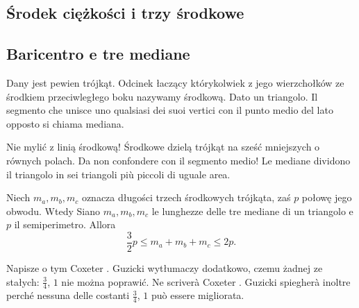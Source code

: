 
%

\subsection{Środek ciężkości i trzy środkowe} %
\subsection{Baricentro e tre mediane} %

\begin{definition}
[środkowa] %
[mediana] %
    Dany jest pewien trójkąt. %
    Odcinek łaczący którykolwiek z jego wierzchołków ze środkiem przeciwległego boku nazywamy środkową. %
    Dato un triangolo. %
    Il segmento che unisce uno qualsiasi dei suoi vertici con il punto medio del lato opposto si chiama mediana. %
\end{definition}

Nie mylić z linią środkową! %
Środkowe dzielą trójkąt na sześć mniejszych o równych polach. %
Da non confondere con il segmento medio! %
Le mediane dividono il triangolo in sei triangoli più piccoli di uguale area. %


\begin{proposition}
    Niech $m_a, m_b, m_c$ oznacza długości trzech środkowych trójkąta, zaś $p$ połowę jego obwodu. %
    Wtedy %
    Siano $m_a, m_b, m_c$ le lunghezze delle tre mediane di un triangolo e $p$ il semiperimetro. %
    Allora %
    \begin{equation}
        \frac 32 p \le m_a + m_b + m_c \le 2p.
    \end{equation}
\end{proposition}

Napisze o tym Coxeter \cite[s. 26]{coxeter_1967}. %
Guzicki \cite[s. 357]{guzicki_2021} wytłumaczy dodatkowo, czemu żadnej ze stałych: $\frac 34$, $1$ nie można poprawić. %
Ne scriverà Coxeter \cite[p. 26]{coxeter_1967}. %
Guzicki \cite[p. 357]{guzicki_2021} spiegherà inoltre perché nessuna delle costanti $\frac 34$, $1$ può essere migliorata. %

